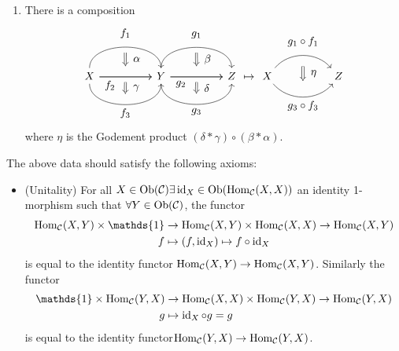 \begin{defi}
\begin{enumerate}
		\item 
		There is a composition
		\[
		\begin{tikzcd}[column sep=huge]	
			X
			\arrow[bend left=90]{r}[name=U,label=above:$f_1$]{}
			\arrow[bend right=90]{r}[name=D,label=below:$f_3$]{}
			\arrow{r}[name=M]{}
			\arrow{r}[label=below:$f_2$, pos=0.2]{}
			&
			Y
			\arrow[shorten <=5pt,shorten >=5pt,Rightarrow,to path={(U) -- node[label=right:$\alpha$] {} (M)}]{}
			\arrow[shorten <=5pt,shorten >=5pt,Rightarrow,to path={(M) -- node[label=right:$\gamma$] {} (D)}]{}
			\arrow[bend left=90]{r}[name=U',label=above:$g_1$]{}
			\arrow[bend right=90]{r}[name=D',label=below:$g_3$]{}
			\arrow{r}[name=M']{}
			\arrow{r}[label=below:$g_2$, pos=0.2]{}
			&
			Z
			\arrow[shorten <=5pt,shorten >=5pt,Rightarrow,to path={(U') -- node[label=right:$\beta$] {} (M')}]{}
			\arrow[shorten <=5pt,shorten >=5pt,Rightarrow,to path={(M') -- node[label=right:$\delta$] {} (D')}]{}    	
		\end{tikzcd}	
		\mapsto 
		\begin{tikzcd}
			X
			\arrow[bend left=50]{rr}[name=U',label=above:$g_1 \circ f_1$]{}
			\arrow[bend right=50]{rr}[name=D',label=below:$g_3 \circ f_3$]{}
			&&
			Z
			\arrow[shorten <=10pt,shorten >=10pt,Rightarrow,to path={(U')-- node[label=right:$ \eta $] {} (D')}]{}
		\end{tikzcd}	
		\]
		where $\eta $ is the Godement product $( \delta * \gamma ) \circ ( \beta * \alpha ) $.
	\end{enumerate}

The above data should satisfy the following axioms:
\begin{itemize}
	\item 
	(Unitality) 
	For all $ X \in \operatorname{Ob} ( \mathcal{ C } ) \exists \operatorname{id}_X \in \operatorname{Ob} ( \operatorname{Hom}_{ \mathcal{C } } ( X, X ))$ an identity 1-morphism such that $ \forall Y \in \operatorname{Ob}( \mathcal{ C } ) $, the functor 
	\begin{align*}
		\Hom_{ \mathcal{ C } } ( X , Y ) \times \mathds{ 1 } &\to \Hom_{ \mathcal{ C } } ( X , Y ) \times \Hom_{ \mathcal{ C } } ( X , X ) \to \Hom_{ \mathcal{C } } ( X, Y )
		\\
		f &\mapsto (f, \id_X ) \mapsto f \circ \id_X
	\end{align*}
is equal to the identity functor $ \operatorname{Hom}_{ \mathcal{ C } } ( X , Y ) \to \operatorname{Hom}_{ \mathcal{ C }  } ( X, Y )$.
Similarly the functor
	\begin{align*}
		\mathds{ 1 } \times \Hom_{ \mathcal{ C } } ( Y , X ) &\to \Hom_{ \mathcal{ C } } ( X , X ) \times \Hom_{ \mathcal{ C } } ( Y , X ) \to \Hom_{ \mathcal{C } } ( Y, X )
		\\
		g &\mapsto \id_X \circ g = g
	\end{align*}
is equal to the identity functor$ \operatorname{Hom}_{ \mathcal{ C } } ( Y , X ) \to \operatorname{Hom}_{ \mathcal{ C }  }(  Y , X )$.


\end{itemize}
\end{defi}
